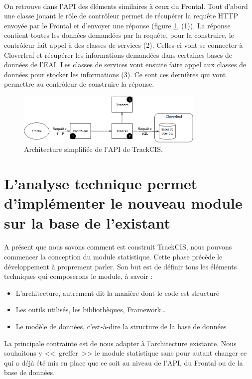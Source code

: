 			\paragraph{}
			On retrouve dans l'API des éléments similaires à ceux du Frontal. Tout
			d'abord une classe jouant le rôle de contrôleur permet de récupérer la requête HTTP
			envoyée par le Frontal et d'envoyer une réponse (figure
			\ref{archi_actuelle_api}, (1)). La réponse contient toutes les données
			demandées par la requête, pour la construire, le contrôleur fait appel à des
			classes de services (2). Celles-ci vont se connecter à Cloverleaf et
			récupérer les informations demandées dans certaines bases de données de l'EAI. Les
			classes de services vont ensuite faire appel aux classes de données pour
			stocker les informations (3). Ce sont ces dernières qui vont permettre au
			contrôleur de construire la réponse.
			\begin{figure}[H]
				\centering
				\includegraphics[width=9cm]{../img/part3/archi_actuelle_api.png}
				\caption{\label{archi_actuelle_api} Architecture simplifiée de l'API de
				TrackCIS.}
			\end{figure}
	
	\section{L'analyse technique permet d'implémenter le nouveau module sur la base
	de l'existant}
		\paragraph{}
		A présent que nous savons comment est construit TrackCIS, nous pouvons
		commencer la conception du module statistique. Cette phase précède le
		développement à proprement parler. Son but est de définir tous les
		éléments techniques qui composerons le module, à savoir :
		\begin{itemize}
		  \item L'architecture, autrement dit la manière dont le code est structuré
		  \item Les outils utilisés, les bibliothèques, Framework\ldots
		  \item Le modèle de données, c'est-à-dire la structure de la base de données
		\end{itemize}
		La principale contrainte est de nous adapter à l'architecture existante. Nous
		souhaitons y <<~greffer~>> le module statistique sans pour autant changer ce
		qui a déjà été mis en place que ce soit au niveau de l'API, du Frontal ou de la
		base de données.
		
